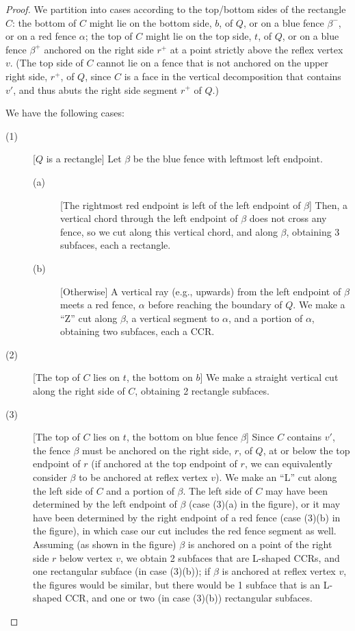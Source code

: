 \documentclass{article}
\begin{document}
\begin{proof}
We partition into cases according to the top/bottom sides of the
rectangle $C$: the bottom of $C$ might lie on the bottom side, $b$, of
$Q$, or on a blue fence $\beta^-$, or on a red fence $\alpha$; the top
of $C$ might lie on the top side, $t$, of $Q$, or on a blue fence
$\beta^+$ anchored on the right side $r^+$ at a point strictly above
the reflex vertex $v$.  (The top side of $C$ cannot lie on a fence
that is not anchored on the upper right side, $r^+$, of $Q$, since $C$
is a face in the vertical decomposition that contains $v'$, and thus
abuts the right side segment $r^+$ of $Q$.)

We have the following cases:
%
\begin{description}
\item[(1)] [$Q$ is a rectangle] 
  Let $\beta$ be the blue fence with leftmost left endpoint.
    \begin{description}
    \item[(a)] [The rightmost red endpoint is left of the left endpoint
        of $\beta$] Then, a vertical chord through the left endpoint
      of $\beta$ does not cross any fence, so we cut along this
      vertical chord, and along $\beta$, obtaining 3 subfaces, each a
      rectangle.
    \item[(b)] [Otherwise] A vertical ray (e.g., upwards) from the
      left endpoint of $\beta$ meets a red fence, $\alpha$ before
      reaching the boundary of $Q$. We make a ``Z'' cut along $\beta$,
      a vertical segment to $\alpha$, and a portion of $\alpha$,
      obtaining two subfaces, each a CCR.
    \end{description}


    \item[(2)] [The top of $C$ lies on $t$, the bottom on $b$] We make
      a straight vertical cut along the right side of $C$,
      obtaining 2 rectangle subfaces.

    \item[(3)] [The top of $C$ lies on $t$, the bottom on blue fence
      $\beta$] Since $C$ contains $v'$, the fence $\beta$ must be
      anchored on the right side, $r$, of $Q$, at or below the top
      endpoint of $r$ (if anchored at the top endpoint of $r$, we can
      equivalently consider $\beta$ to be anchored at reflex vertex
      $v$).  We make an ``L'' cut along the left side of $C$ and a
      portion of $\beta$.  The left side of $C$ may have been
      determined by the left endpoint of $\beta$ (case (3)(a) in the
      figure), or it may have been determined by the right endpoint of
      a red fence (case (3)(b) in the figure), in which case our cut
      includes the red fence segment as well. Assuming (as shown in
      the figure) $\beta$ is anchored on a point of the right side $r$
      below vertex $v$, we obtain 2 subfaces that are L-shaped CCRs,
      and one rectangular subface (in case (3)(b)); if $\beta$ is
      anchored at reflex vertex $v$, the figures would be similar, but
      there would be 1 subface that is an L-shaped CCR, and one or two
      (in case (3)(b)) rectangular subfaces.


\end{description}
\end{proof}
\end{document}
